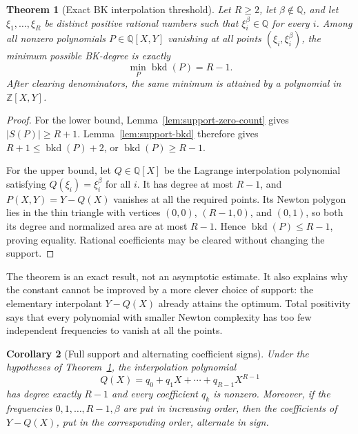 \documentclass[11pt,oneside]{article}
\newtheorem{theorem}{Theorem}[section]
\newtheorem{corollary}[theorem]{Corollary}
\theoremstyle{definition}
\theoremstyle{remark}
\newcommand{\Z}{\mathbb Z}
\newcommand{\Q}{\mathbb Q}
\begin{document}
\begin{theorem}[Exact BK interpolation threshold]
\label{thm:exact-bkd-threshold}
Let $R\ge2$, let $\beta\notin\Q$, and let
$\xi_1,\ldots,\xi_R$ be distinct positive rational numbers such that
$\xi_i^\beta\in\Q$ for every $i$.  Among all nonzero polynomials
$P\in\Q[X,Y]$ vanishing at all points $(\xi_i,\xi_i^\beta)$, the minimum possible
BK-degree is exactly
\begin{equation}
 \min_P\operatorname{bkd}(P)=R-1.
 \label{eq:mc-exact-threshold}
\end{equation}
After clearing denominators, the same minimum is attained by a polynomial in $\Z[X,Y]$.
\end{theorem}

\begin{proof}
For the lower bound, Lemma~\ref{lem:support-zero-count} gives
$|S(P)|\ge R+1$.  Lemma~\ref{lem:support-bkd} therefore gives
$R+1\le\operatorname{bkd}(P)+2$, or
$\operatorname{bkd}(P)\ge R-1$.

For the upper bound, let $Q\in\Q[X]$ be the Lagrange interpolation polynomial satisfying
$Q(\xi_i)=\xi_i^\beta$ for all $i$.  It has degree at most $R-1$, and
$P(X,Y)=Y-Q(X)$ vanishes at all the required points.  Its Newton polygon lies in the thin
triangle with vertices $(0,0)$, $(R-1,0)$, and $(0,1)$, so both its degree and normalized area
are at most $R-1$.  Hence $\operatorname{bkd}(P)\le R-1$, proving equality.  Rational
coefficients may be cleared without changing the support.
\end{proof}

The theorem is an exact result, not an asymptotic estimate.  It also explains why the constant
cannot be improved by a more clever choice of support: the elementary interpolant
$Y-Q(X)$ already attains the optimum.  Total positivity says that every polynomial with smaller
Newton complexity has too few independent frequencies to vanish at all the points.

\begin{corollary}[Full support and alternating coefficient signs]
\label{cor:full-support-interpolant}
Under the hypotheses of Theorem~\ref{thm:exact-bkd-threshold}, the interpolation polynomial
\[
 Q(X)=q_0+q_1X+\cdots+q_{R-1}X^{R-1}
\]
has degree exactly $R-1$ and every coefficient $q_k$ is nonzero.  Moreover, if the frequencies
$0,1,\ldots,R-1,\beta$ are put in increasing order, then the coefficients of
$Y-Q(X)$, put in the corresponding order, alternate in sign.
\end{corollary}
\end{document}
